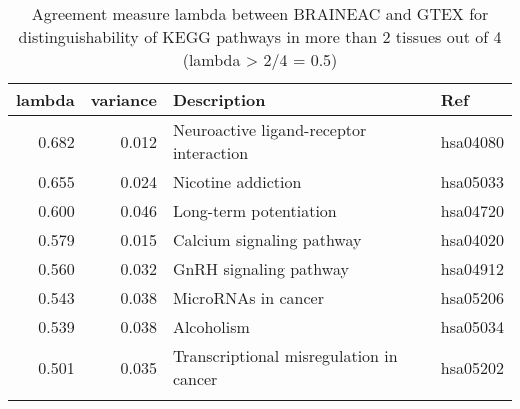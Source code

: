 \begin{longtable}{rrll}
  \hline
lambda & variance & Description & Ref \\ 
  \hline
0.682 & 0.012 & Neuroactive ligand-receptor interaction  & hsa04080 \\ 
  0.655 & 0.024 & Nicotine addiction  & hsa05033 \\ 
  0.600 & 0.046 & Long-term potentiation  & hsa04720 \\ 
  0.579 & 0.015 & Calcium signaling pathway  & hsa04020 \\ 
  0.560 & 0.032 & GnRH signaling pathway  & hsa04912 \\ 
  0.543 & 0.038 & MicroRNAs in cancer  & hsa05206 \\ 
  0.539 & 0.038 & Alcoholism  & hsa05034 \\ 
  0.501 & 0.035 & Transcriptional misregulation in cancer  & hsa05202 \\ 
   \hline
\hline
\caption{Agreement measure lambda between BRAINEAC and GTEX for distinguishability of KEGG pathways in more than 2 tissues out of 4 (lambda > 2/4 = 0.5)} 
\label{KEGG}
\end{longtable}
